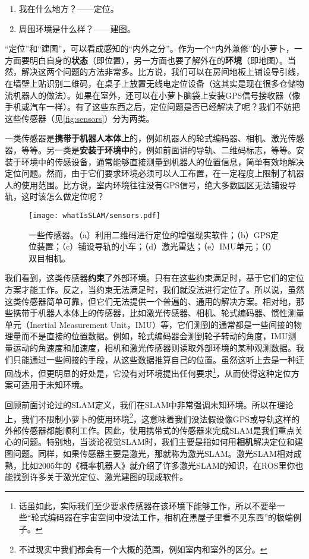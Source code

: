 \begin{enumerate}
	\item 我在什么地方？——定位。
	\item 周围环境是什么样？——建图。
\end{enumerate}

“定位”和“建图”，可以看成感知的“内外之分”。作为一个“内外兼修”的小萝卜，一方面要明白自身的\textbf{状态}（即位置），另一方面也要了解外在的\textbf{环境}（即地图）。当然，解决这两个问题的方法非常多。比方说，我们可以在房间地板上铺设导引线，在墙壁上贴识别二维码，在桌子上放置无线电定位设备（这其实是现在很多仓储物流机器人的做法）。如果在室外，还可以在小萝卜脑袋上安装GPS信号接收器（像手机或汽车一样）。有了这些东西之后，定位问题是否已经解决了呢？我们不妨把这些传感器（见\autoref{fig:sensors}）分为两类。

一类传感器是\textbf{携带于机器人本体上}的，例如机器人的轮式编码器、相机、激光传感器，等等。另一类是\textbf{安装于环境中}的，例如前面讲的导轨、二维码标志，等等。安装于环境中的传感设备，通常能够直接测量到机器人的位置信息，简单有效地解决定位问题。然而，由于它们要求环境必须可以人工布置，在一定程度上限制了机器人的使用范围。比方说，室内环境往往没有GPS信号，绝大多数园区无法铺设导轨，这时该怎么做定位呢？

\begin{figure}[!ht]
	\centering
	\texttt{[image: whatIsSLAM/sensors.pdf]}
	\caption{一些传感器。（a）利用二维码进行定位的增强现实软件；（b）GPS定位装置；（c）铺设导轨的小车；（d）激光雷达；（e）IMU单元；（f）双目相机。}
	\label{fig:sensors}
\end{figure}

我们看到，这类传感器\textbf{约束}了外部环境。只有在这些约束满足时，基于它们的定位方案才能工作。反之，当约束无法满足时，我们就没法进行定位了。所以说，虽然这类传感器简单可靠，但它们无法提供一个普遍的、通用的解决方案。相对地，那些携带于机器人本体上的传感器，比如激光传感器、相机、轮式编码器、惯性测量单元（Inertial Measurement Unit，IMU）等，它们测到的通常都是一些间接的物理量而不是直接的位置数据。例如，轮式编码器会测到轮子转动的角度，IMU测量运动的角速度和加速度，相机和激光传感器则读取外部环境的某种观测数据。我们只能通过一些间接的手段，从这些数据推算自己的位置。虽然这听上去是一种迂回战术，但更明显的好处是，它没有对环境提出任何要求\footnote{话虽如此，实际我们至少要求传感器在该环境下能够工作，所以不要举一些“轮式编码器在宇宙空间中没法工作，相机在黑屋子里看不见东西”的极端例子。}，从而使得这种定位方案可适用于未知环境。

回顾前面讨论过的SLAM定义，我们在SLAM中非常强调未知环境。所以在理论上，我们不限制小萝卜的使用环境\footnote{不过现实中我们都会有一个大概的范围，例如室内和室外的区分。}，这意味着我们没法假设像GPS或导轨这样的外部传感器都能顺利工作。因此，使用携带式的传感器来完成SLAM是我们重点关心的问题。特别地，当谈论视觉SLAM时，我们主要是指如何用\textbf{相机}解决定位和建图问题。同样，如果传感器主要是激光，那就称为激光SLAM。激光SLAM相对成熟，比如2005年的《概率机器人》\textsuperscript{\cite{Thrun2005}}就介绍了许多激光SLAM的知识，在ROS里你也能找到许多关于激光定位、激光建图的现成软件。

